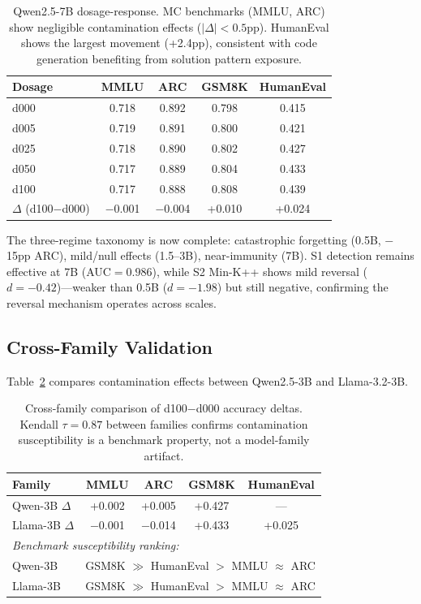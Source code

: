\documentclass[11pt,a4paper]{article}
\begin{document}
\begin{table}[t]
\centering
\small
\begin{tabular}{lcccc}
\toprule
\textbf{Dosage} & \textbf{MMLU} & \textbf{ARC} & \textbf{GSM8K} & \textbf{HumanEval} \\
\midrule
d000 & 0.718 & 0.892 & 0.798 & 0.415 \\
d005 & 0.719 & 0.891 & 0.800 & 0.421 \\
d025 & 0.718 & 0.890 & 0.802 & 0.427 \\
d050 & 0.717 & 0.889 & 0.804 & 0.433 \\
d100 & 0.717 & 0.888 & 0.808 & 0.439 \\
\midrule
$\Delta$ (d100$-$d000) & $-$0.001 & $-$0.004 & +0.010 & +0.024 \\
\bottomrule
\end{tabular}
\caption{Qwen2.5-7B dosage-response. MC benchmarks (MMLU, ARC) show negligible contamination effects ($|\Delta| < 0.5$pp). HumanEval shows the largest movement (+2.4pp), consistent with code generation benefiting from solution pattern exposure.}
\label{tab:7b}
\end{table}

The three-regime taxonomy is now complete: catastrophic forgetting (0.5B, $-$15pp ARC), mild/null effects (1.5--3B), near-immunity (7B). S1 detection remains effective at 7B (AUC${=}0.986$), while S2 Min-K++ shows mild reversal ($d{=}{-}0.42$)---weaker than 0.5B ($d{=}{-}1.98$) but still negative, confirming the reversal mechanism operates across scales.

\subsection{Cross-Family Validation}

Table~\ref{tab:crossfamily} compares contamination effects between Qwen2.5-3B and Llama-3.2-3B.

\begin{table}[t]
\centering
\small
\begin{tabular}{lcccc}
\toprule
\textbf{Family} & \textbf{MMLU} & \textbf{ARC} & \textbf{GSM8K} & \textbf{HumanEval} \\
\midrule
Qwen-3B $\Delta$ & +0.002 & +0.005 & +0.427 & --- \\
Llama-3B $\Delta$ & $-$0.001 & $-$0.014 & +0.433 & +0.025 \\
\midrule
\multicolumn{5}{l}{\textit{Benchmark susceptibility ranking:}} \\
Qwen-3B & \multicolumn{4}{l}{GSM8K $\gg$ HumanEval $>$ MMLU $\approx$ ARC} \\
Llama-3B & \multicolumn{4}{l}{GSM8K $\gg$ HumanEval $>$ MMLU $\approx$ ARC} \\
\bottomrule
\end{tabular}
\caption{Cross-family comparison of d100$-$d000 accuracy deltas. Kendall $\tau{=}0.87$ between families confirms contamination susceptibility is a benchmark property, not a model-family artifact.}
\label{tab:crossfamily}
\end{table}
\end{document}
